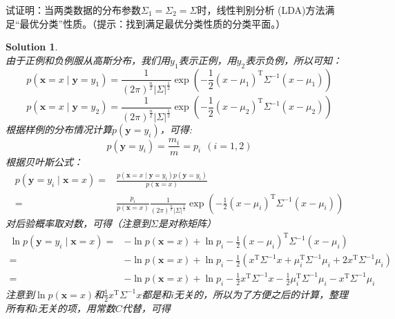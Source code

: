 \documentclass[a4paper,UTF8]{article}
\numberwithin{equation}{section}
\newtheorem*{solution}{Solution}
\begin{document}
试证明：当两类数据的分布参数$\Sigma_1=\Sigma_2=\Sigma$时，线性判别分析 (LDA)方法满足“最优分类”性质。（提示：找到满足最优分类性质的分类平面。）
\begin{solution}
~\\
由于正例和负例服从高斯分布，我们用$y_1$表示正例，用$y_2$表示负例，所以可知：\\
\begin{equation}
p(\mathbf{x} = x \mid \mathbf{y} = y_1) = \frac{1}{(2\pi)^{\frac{n}{2}}\lvert \Sigma \rvert^{\frac{1}{2}}}\exp(-\frac{1}{2}(x - \mu_1)^\mathrm{T}\Sigma^{-1}(x - \mu_1)
)
\end{equation}
\begin{equation}
p(\mathbf{x} = x \mid \mathbf{y} = y_2) = \frac{1}{(2\pi)^{\frac{n}{2}}\lvert \Sigma \rvert^{\frac{1}{2}}}\exp(-\frac{1}{2}(x - \mu_2)^\mathrm{T}\Sigma^{-1}(x - \mu_2)
)
\end{equation}
根据样例的分布情况计算$p(\mathbf{y}=y_i)$，可得:
\begin{equation}
p(\mathbf{y}=y_i) = \frac{m_i}{m} = p_i\ \ (i = 1, 2)
\end{equation}
根据贝叶斯公式：
\begin{equation}
\begin{aligned}
p(\mathbf{y} = y_i \mid  \mathbf{x} = x) 
=& \frac{p(\mathbf{x} = x \mid \mathbf{y} = y_i)p(\mathbf{y} = y_i)}{p(\mathbf{x} = x)} \\
=& \frac{p_i}{p(\mathbf{x} = x)}\frac{1}{(2\pi)^{\frac{n}{2}}\lvert \Sigma \rvert^{\frac{1}{2}}}\exp(-\frac{1}{2}(x - \mu_i)^\mathrm{T}\Sigma^{-1}(x - \mu_i))
\end{aligned}
\end{equation}
对后验概率取对数，可得（注意到$\Sigma$是对称矩阵）
\begin{equation}
\begin{aligned}
\ln p(\mathbf{y} = y_i \mid  \mathbf{x} = x) 
=& -\ln p(\mathbf{x} = x) + \ln p_i - \frac{1}{2}(x - \mu_i)^\mathrm{T}\Sigma^{-1}(x - \mu_i)\\
=& -\ln p(\mathbf{x} = x) + \ln p_i - \frac{1}{2}(x^\mathrm{T}\Sigma^{-1}x + \mu_i^\mathrm{T}\Sigma^{-1}\mu_i + 2x^{\mathrm{T}}\Sigma^{-1}\mu_i)\\
=& -\ln p(\mathbf{x} = x) + \ln p_i - \frac{1}{2}x^\mathrm{T}\Sigma^{-1}x - \frac{1}{2} \mu_i^\mathrm{T}\Sigma^{-1}\mu_i - x^{\mathrm{T}}\Sigma^{-1}\mu_i
\end{aligned}
\end{equation}
注意到$\ln p(\mathbf{x} = x)$和$\frac{1}{2}x^\mathrm{T}\Sigma^{-1}x$都是和$i$无关的，所以为了方便之后的计算，整理所有和$i$无关的项，用常数$C$代替，可得

\end{solution}
\end{document}
